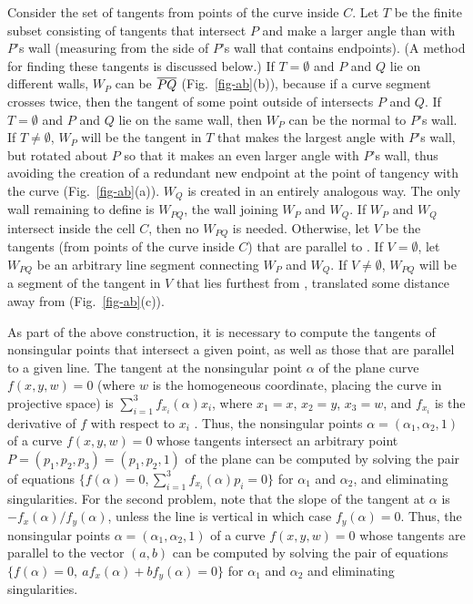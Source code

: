 Consider the set of tangents from points of the curve inside $C$.
Let $T$ be the finite subset consisting of tangents that intersect $P$
and make a larger angle than  with $P$'s wall 
(measuring from the side of $P$'s wall that contains endpoints).
(A method for finding these tangents is discussed below.)
If $T = \emptyset$ and $P$ and $Q$ lie on different walls,
$W_{P}$ can be $\mbox{$\overline{PQ}$}$ (Fig.~\ref{fig-ab}(b)), 
because if a curve segment crosses  
twice, then the tangent of some point outside of  intersects $P$ and $Q$.
If $T = \emptyset$ and $P$ and $Q$ lie on the same wall, 
then $W_{P}$ can be the normal to $P$'s wall.
If $T \neq \emptyset$, $W_{P}$ will be
the tangent in $T$ that makes the largest angle with $P$'s wall,
but rotated about $P$ so that
it makes an even larger angle with $P$'s wall, thus avoiding the creation of a redundant
new endpoint at the point of tangency with the curve (Fig.~\ref{fig-ab}(a)).
$W_{Q}$ is created in an entirely analogous way.
The only wall remaining to define is $W_{PQ}$, the wall joining $W_{P}$ and $W_{Q}$.
If $W_{P}$ and $W_{Q}$ intersect inside the cell $C$, then no $W_{PQ}$ is needed.
Otherwise, let $V$ be the tangents (from points of the curve inside $C$) that are
parallel to .
If $V = \emptyset$, let $W_{PQ}$ be an arbitrary line segment connecting $W_{P}$
and $W_{Q}$.
If $V \neq \emptyset$, $W_{PQ}$ will be a segment of the tangent in $V$ 
that lies furthest from , translated some distance away from 
(Fig.~\ref{fig-ab}(c)).


As part of the above construction, it is necessary to compute the tangents of nonsingular
points that intersect a given point, as well as those that are parallel to a given line.
The tangent at the nonsingular point $\alpha$ of the plane
curve \mbox{$f(x,y,w)=0$} (where $w$ is the homogeneous coordinate, placing the curve in
projective space) is $\sum_{i=1}^{3} f_{x_{i}}(\alpha) x_{i}$, where $x_{1} = x$,
$x_{2} = y$, $x_{3} = w$, and $f_{x_{i}}$ is the derivative of $f$ with respect to $x_{i}$
\cite{walker}.
Thus, the nonsingular points $\alpha = (\alpha_{1}, \alpha_{2}, 1)$ of a curve 
\mbox{$f(x,y,w)=0$}
whose tangents intersect an arbitrary point $P = (p_{1},p_{2},p_{3}) = (p_{1},p_{2},1)$
of the plane can be computed by solving the pair of equations 
$\{f(\alpha) = 0, \sum_{i=1}^{3} f_{x_{i}}(\alpha) p_{i} = 0 \}$ 
for $\alpha_{1}$ and $\alpha_{2}$, and eliminating singularities.
For the second problem, note that the slope of the tangent at $\alpha$ is 
$-f_{x}(\alpha) / f_{y}(\alpha)$, unless the line is vertical in which case 
$f_{y}(\alpha) = 0$.
Thus, the nonsingular points $\alpha = (\alpha_{1}, \alpha_{2}, 1)$ of a curve $f(x,y,w)=0$
whose tangents are parallel to the vector $(a,b)$
can be computed by solving the pair of equations 
$\{f(\alpha) = 0,\ a f_{x}(\alpha) + b f_{y}(\alpha) = 0 \}$ 
for $\alpha_{1}$ and $\alpha_{2}$ and eliminating singularities.


